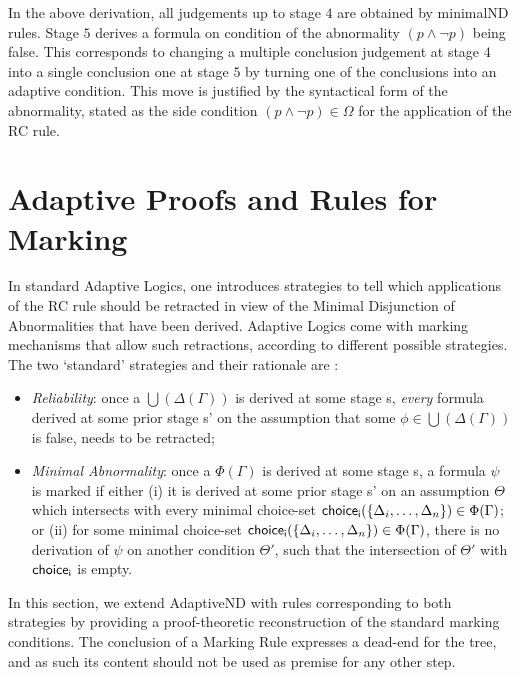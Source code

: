 \documentclass[]{article}
\begin{document}
In the above derivation, all judgements up to stage $4$ are obtained by {\sf minimalND} rules. Stage $5$ derives a formula on condition of the abnormality $(p\wedge \neg p)$ being false.  This corresponds to changing a multiple conclusion judgement at stage $4$ into a single conclusion one at stage $5$ by turning one of the conclusions into an adaptive condition. This move is justified by the syntactical form of the abnormality, stated as the side condition $(p \wedge \neg p)\in \Omega$ for the application of the {\sf RC} rule.



\section{Adaptive Proofs and Rules for Marking}\label{sec:marking}

In standard Adaptive Logics, one introduces strategies to tell which applications of the {\sf RC} rule should be retracted in view of the Minimal Disjunction of Abnormalities that have been derived. Adaptive Logics come with marking mechanisms that allow such retractions, according to different possible strategies. The two `standard' strategies and their rationale are \cite{batens01}:

\begin{itemize}
    \item \textit{Reliability}: once a $\bigcup(\Delta(\Gamma))$ is derived at some stage {\sf s}, \textit{every} formula derived at some prior stage {\sf s'} on the assumption that some $\phi\in \bigcup(\Delta(\Gamma))$ is false, needs to be retracted;

\item \textit{Minimal Abnormality}: once a $\Phi(\Gamma)$ is derived at some stage {\sf s}, a formula $\psi$ is marked if either (i) it is derived at some prior stage {\sf s'} on an assumption $\Theta$ which intersects with every minimal choice-set ${\sf choice_{i}}(\{\Delta_{i}, \ldots, \Delta_{n}\})\in \Phi(\Gamma)$; or (ii) for some minimal choice-set ${\sf choice_{i}}(\{\Delta_{i}, \ldots, \Delta_{n}\})\in \Phi(\Gamma)$, there is no derivation of $\psi$ on another condition $\Theta'$, such that the intersection of $\Theta'$ with ${\sf choice_{i}}$ is empty.
\end{itemize}
%
In this section, we extend {\sf AdaptiveND} with rules corresponding to both strategies by providing a proof-theoretic reconstruction of the standard marking conditions. The conclusion of a Marking Rule expresses a dead-end for the tree, and as such its content should not be used as premise for any other step.
\end{document}
